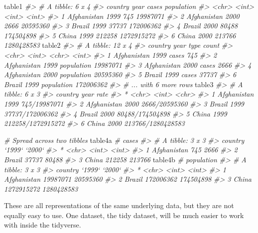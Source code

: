 \documentclass[]{book}
\newenvironment{Shaded}{\begin{snugshade}}{\end{snugshade}}
\newcommand{\CommentTok}[1]{\textcolor[rgb]{0.56,0.35,0.01}{\textit{#1}}}
\newcommand{\NormalTok}[1]{#1}
\theoremstyle{definition}
\theoremstyle{definition}
\theoremstyle{definition}
\theoremstyle{remark}
\begin{document}
\begin{Shaded}
\begin{Highlighting}[]
\NormalTok{table1}
\CommentTok{#> # A tibble: 6 x 4}
\CommentTok{#>   country      year  cases population}
\CommentTok{#>   <chr>       <int>  <int>      <int>}
\CommentTok{#> 1 Afghanistan  1999    745   19987071}
\CommentTok{#> 2 Afghanistan  2000   2666   20595360}
\CommentTok{#> 3 Brazil       1999  37737  172006362}
\CommentTok{#> 4 Brazil       2000  80488  174504898}
\CommentTok{#> 5 China        1999 212258 1272915272}
\CommentTok{#> 6 China        2000 213766 1280428583}
\NormalTok{table2}
\CommentTok{#> # A tibble: 12 x 4}
\CommentTok{#>   country      year type           count}
\CommentTok{#>   <chr>       <int> <chr>          <int>}
\CommentTok{#> 1 Afghanistan  1999 cases            745}
\CommentTok{#> 2 Afghanistan  1999 population  19987071}
\CommentTok{#> 3 Afghanistan  2000 cases           2666}
\CommentTok{#> 4 Afghanistan  2000 population  20595360}
\CommentTok{#> 5 Brazil       1999 cases          37737}
\CommentTok{#> 6 Brazil       1999 population 172006362}
\CommentTok{#> # ... with 6 more rows}
\NormalTok{table3}
\CommentTok{#> # A tibble: 6 x 3}
\CommentTok{#>   country      year rate             }
\CommentTok{#> * <chr>       <int> <chr>            }
\CommentTok{#> 1 Afghanistan  1999 745/19987071     }
\CommentTok{#> 2 Afghanistan  2000 2666/20595360    }
\CommentTok{#> 3 Brazil       1999 37737/172006362  }
\CommentTok{#> 4 Brazil       2000 80488/174504898  }
\CommentTok{#> 5 China        1999 212258/1272915272}
\CommentTok{#> 6 China        2000 213766/1280428583}

\CommentTok{# Spread across two tibbles}
\NormalTok{table4a  }\CommentTok{# cases}
\CommentTok{#> # A tibble: 3 x 3}
\CommentTok{#>   country     `1999` `2000`}
\CommentTok{#> * <chr>        <int>  <int>}
\CommentTok{#> 1 Afghanistan    745   2666}
\CommentTok{#> 2 Brazil       37737  80488}
\CommentTok{#> 3 China       212258 213766}
\NormalTok{table4b  }\CommentTok{# population}
\CommentTok{#> # A tibble: 3 x 3}
\CommentTok{#>   country         `1999`     `2000`}
\CommentTok{#> * <chr>            <int>      <int>}
\CommentTok{#> 1 Afghanistan   19987071   20595360}
\CommentTok{#> 2 Brazil       172006362  174504898}
\CommentTok{#> 3 China       1272915272 1280428583}
\end{Highlighting}
\end{Shaded}

These are all representations of the same underlying data, but they are
not equally easy to use. One dataset, the tidy dataset, will be much
easier to work with inside the tidyverse.
\end{document}

